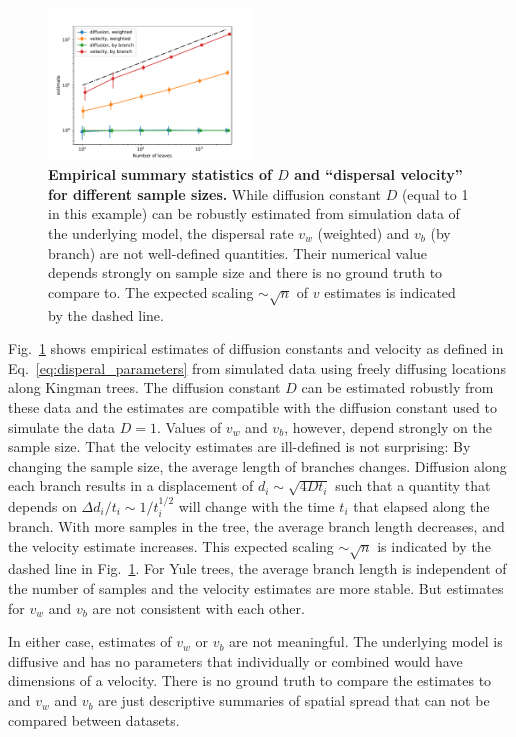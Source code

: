 \documentclass[aps,rmp, twocolumn]{revtex4}
\begin{document}
\begin{figure}[tb]
    \includegraphics*[width=0.48\textwidth]{figures/kingman_dispersal.pdf}
    \caption{\label{fig:D_and_v}{\bf Empirical summary statistics of $D$ and ``dispersal velocity'' for different sample sizes.}
    While diffusion constant $D$ (equal to 1 in this example) can be robustly estimated from simulation data of the underlying model, the dispersal rate $v_w$ (weighted) and $v_b$ (by branch) are not well-defined quantities. Their numerical value depends strongly on sample size and there is no ground truth to compare to. The expected scaling $\sim \sqrt{n}$ of $v$ estimates is indicated by the dashed line.}
\end{figure}


Fig.~\ref{fig:D_and_v} shows empirical estimates of diffusion constants and velocity as defined in Eq.~\ref{eq:disperal_parameters} from simulated data using freely diffusing locations along Kingman trees.
The diffusion constant $D$ can be estimated robustly from these data and the estimates are compatible with the diffusion constant used to simulate the data $D=1$.
Values of $v_w$ and $v_b$, however, depend strongly on the sample size.
That the velocity estimates are ill-defined is not surprising: By changing the sample size, the average length of branches changes. Diffusion along each branch results in a displacement of $d_i \sim \sqrt{4Dt_i}$ such that a quantity that depends on $\Delta d_i / t_i \sim 1/t_i^{1/2}$ will change with the time $t_i$ that elapsed along the branch.
With more samples in the tree, the average branch length decreases, and the velocity estimate increases.
This expected scaling $\sim \sqrt{n}$ is indicated by the dashed line in Fig.~\ref{fig:D_and_v}.
For Yule trees, the average branch length is independent of the number of samples and the velocity estimates are more stable.
But estimates for $v_w$ and $v_b$ are not consistent with each other.

In either case, estimates of $v_w$ or $v_b$ are not meaningful.
The underlying model is diffusive and has no parameters that individually or combined would have dimensions of a velocity.
There is no ground truth to compare the estimates to and $v_w$ and $v_b$ are just descriptive summaries of spatial spread that can not be compared between datasets.
\end{document}
